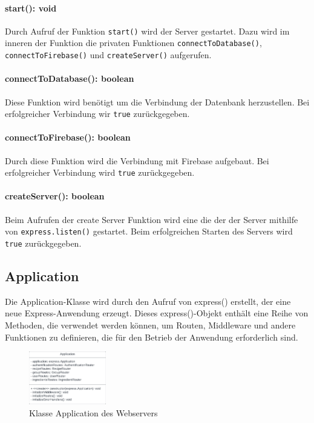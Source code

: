 \documentclass[parskip=full]{scrartcl}
\begin{document}
\paragraph{start(): void}Durch Aufruf der Funktion \texttt{start()} wird der Server gestartet. Dazu wird im inneren der Funktion die privaten Funktionen \texttt{connectToDatabase()}, \texttt{connectToFirebase()} und \texttt{createServer()} aufgerufen.
\paragraph{connectToDatabase(): boolean}Diese Funktion wird benötigt um die Verbindung der Datenbank herzustellen. Bei erfolgreicher Verbindung wir \texttt{true} zurückgegeben.
\paragraph{connectToFirebase(): boolean}Durch diese Funktion wird die Verbindung mit Firebase aufgebaut. Bei erfolgreicher Verbindung wird \texttt{true} zurückgegeben.
\paragraph{createServer(): boolean}Beim Aufrufen der create Server Funktion wird eine die der der Server mithilfe von \texttt{express.listen()} gestartet. Beim erfolgreichen Starten des Servers wird \texttt{true} zurückgegeben.


\subsection{Application}
Die Application-Klasse wird durch den Aufruf von express() erstellt, der eine neue Express-Anwendung erzeugt. Dieses express()-Objekt enthält eine Reihe von Methoden, die verwendet werden können, um Routen, Middleware und andere Funktionen zu definieren, die für den Betrieb der Anwendung erforderlich sind.

\begin{figure}[htp]
    \centering
    \includegraphics[width = 0.3\textwidth]{images/webserver/application.pdf}
    \caption{Klasse Application des Webservers}
    \label{fig:application}
\end{figure}
\end{document}
